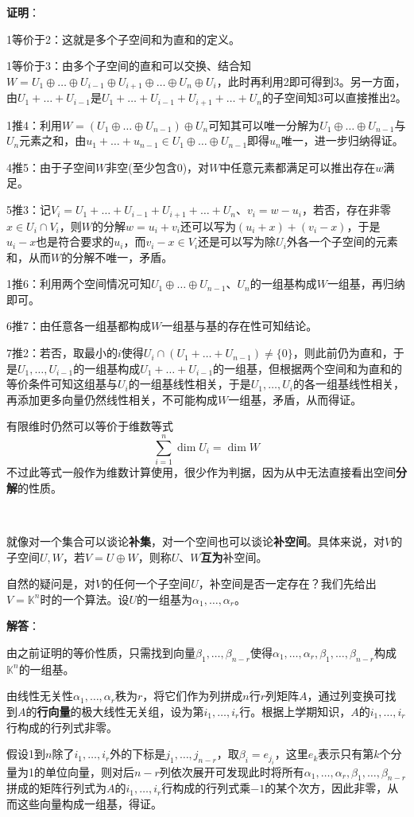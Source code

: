 \documentclass[a4paper,UTF8,fontset=windows,AutoFakeBold]{ctexart}
\newcommand{\proo}[1]{{\vspace{5pt}\kaishu\noindent\textbf{证明}：\vspace{-3pt}
\begin{compactitem}
    \item[] #1
\end{compactitem}
}}
\newcommand{\sol}[1]{{\vspace{5pt}\kaishu\noindent\textbf{解答}：\vspace{-3pt}
\begin{compactitem}
    \item[] #1
\end{compactitem}
}}
\begin{document}
\proo{
    1等价于2：这就是多个子空间和为直和的定义。

    1等价于3：由多个子空间的直和可以交换、结合知$W=U_1\oplus\dots\oplus U_{i-1}\oplus U_{i+1}\oplus\dots\oplus U_n\oplus U_i$，此时再利用2即可得到3。另一方面，由$U_1+\dots+U_{i-1}$是$U_1+\dots+U_{i-1}+U_{i+1}+\dots+U_n$的子空间知3可以直接推出2。

    1推4：利用$W=(U_1\oplus\dots\oplus U_{n-1})\oplus U_n$可知其可以唯一分解为$U_1\oplus\dots\oplus U_{n-1}$与$U_n$元素之和，由$u_1+\dots+u_{n-1}\in U_1\oplus\dots\oplus U_{n-1}$即得$u_n$唯一，进一步归纳得证。

    4推5：由于子空间$W$非空(至少包含0)，对$W$中任意元素都满足可以推出存在$w$满足。

    5推3：记$V_i=U_1+\dots+U_{i-1}+U_{i+1}+\dots+U_n$、$v_i=w-u_i$，若否，存在非零$x\in U_i\cap V_i$，则$W$的分解$w=u_i+v_i$还可以写为$(u_i+x)+(v_i-x)$，于是$u_i-x$也是符合要求的$u_i$，而$v_i-x\in V_i$还是可以写为除$U_i$外各一个子空间的元素和，从而$W$的分解不唯一，矛盾。

    1推6：利用两个空间情况可知$U_1\oplus\dots\oplus U_{n-1}$、$U_n$的一组基构成$W$一组基，再归纳即可。

    6推7：由任意各一组基都构成$W$一组基与基的存在性可知结论。

    7推2：若否，取最小的$i$使得$U_i\cap(U_1+\dots+U_{n-1})\ne\{0\}$，则此前仍为直和，于是$U_1,\dots,U_{i-1}$的一组基构成$U_1+\dots+U_{i-1}$的一组基，但根据两个空间和为直和的等价条件可知这组基与$U_i$的一组基线性相关，于是$U_1,\dots,U_i$的各一组基线性相关，再添加更多向量仍然线性相关，不可能构成$W$一组基，矛盾，从而得证。
}

\noindent 有限维时仍然可以等价于维数等式
$$\sum_{i=1}^n\dim U_i=\dim W$$
不过此等式一般作为维数计算使用，很少作为判据，因为从中无法直接看出空间\textbf{分解}的性质。

\

就像对一个集合可以谈论\textbf{补集}，对一个空间也可以谈论\textbf{补空间}。具体来说，对$V$的子空间$U,W$，若$V=U\oplus W$，则称$U$、$W$\textbf{互为}补空间。

自然的疑问是，对$V$的任何一个子空间$U$，补空间是否一定存在？我们先给出$V=\mathbb{K}^n$时的一个算法。设$U$的一组基为$\alpha_1,\dots,\alpha_r$。

\sol{
    由之前证明的等价性质，只需找到向量$\beta_1,\dots,\beta_{n-r}$使得$\alpha_1,\dots,\alpha_r,\beta_1,\dots,\beta_{n-r}$构成$\mathbb{K}^n$的一组基。

    由线性无关性$\alpha_1,\dots,\alpha_r$秩为$r$，将它们作为列拼成$n$行$r$列矩阵$A$，通过列变换可找到$A$的\textbf{行向量}的极大线性无关组，设为第$i_1,\dots,i_r$行。根据上学期知识，$A$的$i_1,\dots,i_r$行构成的行列式非零。

    假设1到$n$除了$i_1,\dots,i_r$外的下标是$j_1,\dots,j_{n-r}$，取$\beta_i=e_{j_i}$，这里$e_k$表示只有第$k$个分量为1的单位向量，则对后$n-r$列依次展开可发现此时将所有$\alpha_1,\dots,\alpha_r,\beta_1,\dots,\beta_{n-r}$拼成的矩阵行列式为$A$的$i_1,\dots,i_r$行构成的行列式乘$-1$的某个次方，因此非零，从而这些向量构成一组基，得证。
}
\end{document}
